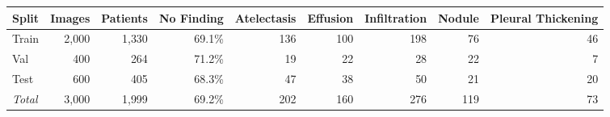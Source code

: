 \begin{tabular}{@{}lrrrrrrrr@{}}
\toprule
\textbf{Split} & \textbf{Images} & \textbf{Patients} & \textbf{No Finding} & \textbf{Atelectasis} & \textbf{Effusion} & \textbf{Infiltration} & \textbf{Nodule} & \textbf{Pleural Thickening} \\
\midrule
Train & 2{,}000 & 1{,}330 & 69.1\% & 136 & 100 & 198 & 76 & 46 \\
Val & 400 & 264 & 71.2\% & 19 & 22 & 28 & 22 & 7 \\
Test & 600 & 405 & 68.3\% & 47 & 38 & 50 & 21 & 20 \\
\midrule
\textit{Total} & 3{,}000 & 1{,}999 & 69.2\% & 202 & 160 & 276 & 119 & 73 \\
\bottomrule
\end{tabular}
